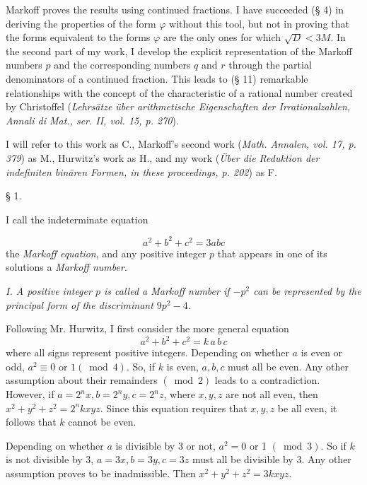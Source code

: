 \documentclass[12pt]{article}
\begin{document}
Markoff proves the results using continued fractions. I have succeeded (§ 4) in deriving the properties of the form $\varphi$ without this tool, but not in proving that the forms equivalent to the forms $\varphi$ are the only ones for which $\sqrt{D}<3M$. In the second part of my work, I develop the explicit representation of the Markoff numbers $p$ and the corresponding numbers $q$ and $r$ through the partial denominators of a continued fraction. This leads to (§ 11) remarkable relationships with the concept of the characteristic of a rational number created by Christoffel (\textit{Lehrsätze über arithmetische Eigenschaften der Irrationalzahlen, Annali di Mat., ser. II, vol. 15, p. 270}).

I will refer to this work as C., Markoff's second work (\textit{Math. Annalen, vol. 17, p. 379}) as M., Hurwitz's work as H., and my work (\textit{Über die Reduktion der indefiniten binären Formen, in these proceedings, p. 202}) as F.

\bigskip

\centerline{§ 1.}

\bigskip

I call the indeterminate equation

\begin{equation*}
a^{2}+b^{2}+c^{2}=3 a b c \tag{1.}
\end{equation*}
the \textit{Markoff equation}, and any positive integer $p$ that appears in one of its solutions a \textit{Markoff number}.

\bigskip

\textit{I. A positive integer $p$ is called a Markoff number if $-p^{2}$ can be represented by the principal form of the discriminant $9 p^{2}-4$.}

\bigskip

Following Mr. Hurwitz, I first consider the more general equation
\begin{equation*}
a^{2}+b^{2}+c^{2}=k \,a\, b\, c \tag{2.}
\end{equation*}
where all signs represent positive integers.
Depending on whether $a$ is even or odd, $a^{2} \equiv 0$ or $1(\bmod 4)$. So, if $k$ is even, $a, b, c$ must all be even. Any other assumption about their remainders $(\bmod 2)$ leads to a contradiction. However, if $a=2^{n} x, b=2^{n} y, c=2^{n} z$, where $x, y, z$ are not all even, then $x^{2}+y^{2}+z^{2}=2^{n} k x y z$. Since this equation requires that $x, y, z$ be all even, it follows that $k$ cannot be even.

Depending on whether $a$ is divisible by 3 or not, $a^{2}=0$ or 1 $(\bmod 3)$. So if $k$ is not divisible by 3, $a=3 x, b=3 y, c=3 z$ must all be divisible by 3. Any other assumption proves to be inadmissible. Then $x^{2}+y^{2}+z^{2}=3 k x y z$.
\end{document}
